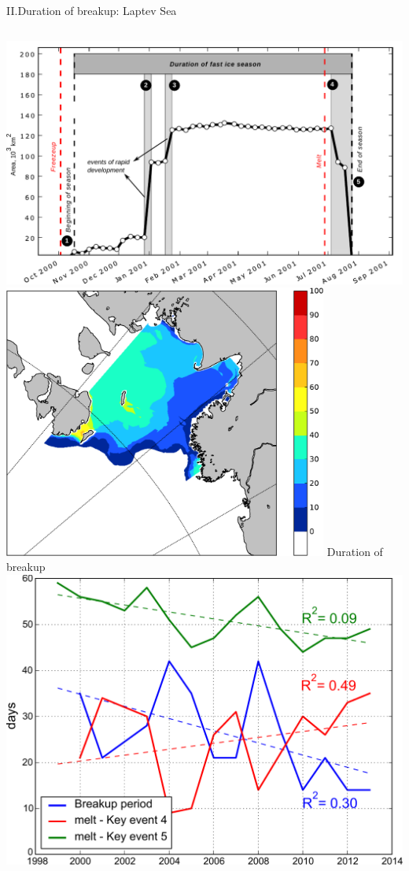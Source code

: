\documentclass[8pt]{beamer}
\begin{document}
\setwatermark{\fontsize{125pt}{125pt}\selectfont{}}
\begin{frame}[fragile]{II.Duration of breakup: Laptev Sea}
	\begin{columns}
		\centering
		\includegraphics[width=1\textwidth]{./img/Key_events_LS0.pdf}
		\includegraphics[width=0.8\textwidth]{./img/7_62_fr_av_clbr.pdf}
		\centering Duration of breakup
		\includegraphics[width=1\textwidth]{./img/Breakup.pdf}

\end{columns}
\end{frame}
\end{document}
